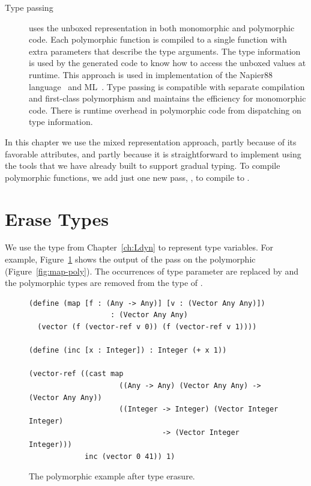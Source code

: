 \documentclass[7x10,nocrop]{TimesAPriori_MIT}%
\begin{document}
\begin{description}
\item[Type passing] uses the unboxed representation in both
  monomorphic and polymorphic code. Each polymorphic function is
  compiled to a single function with extra parameters that describe
  the type arguments. The type information is used by the generated
  code to know how to access the unboxed values at runtime. This
  approach is used in implementation of the Napier88
  language~\citep{Morrison:1991aa} and ML~\citep{Harper:1995um}.  Type
  passing is compatible with separate compilation and first-class
  polymorphism and maintains the efficiency for monomorphic
  code. There is runtime overhead in polymorphic code from dispatching
  on type information.
\end{description}

In this chapter we use the mixed representation approach, partly
because of its favorable attributes, and partly because it is
straightforward to implement using the tools that we have already
built to support gradual typing. To compile polymorphic functions, we
add just one new pass, , to compile \LangInst{} to
\LangCast{}.

\section{Erase Types}
\label{sec:erase-types}

We use the  type from Chapter~\ref{ch:Ldyn} to
represent type variables. For example, Figure~\ref{fig:map-erase}
shows the output of the  pass on the polymorphic
 (Figure~\ref{fig:map-poly}). The occurrences of
type parameter  are replaced by  and the polymorphic
 types are removed from the type of . 

\begin{figure}[tbp]
\begin{lstlisting}
(define (map [f : (Any -> Any)] [v : (Vector Any Any)])
                   : (Vector Any Any)
  (vector (f (vector-ref v 0)) (f (vector-ref v 1))))

(define (inc [x : Integer]) : Integer (+ x 1))

(vector-ref ((cast map
                     ((Any -> Any) (Vector Any Any) -> (Vector Any Any))  
                     ((Integer -> Integer) (Vector Integer Integer)
                               -> (Vector Integer Integer)))
             inc (vector 0 41)) 1)
\end{lstlisting}
\caption{The polymorphic  example after type erasure.}
\label{fig:map-erase}
\end{figure}
\end{document}
